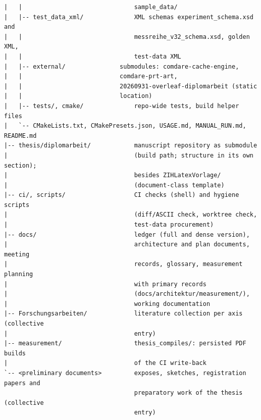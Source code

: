 {\begin{verbatim}
|   |                               sample_data/
|   |-- test_data_xml/              XML schemas experiment_schema.xsd and
|   |                               messreihe_v32_schema.xsd, golden XML,
|   |                               test-data XML
|   |-- external/               submodules: comdare-cache-engine,
|   |                           comdare-prt-art,
|   |                           20260931-overleaf-diplomarbeit (static
|   |                           location)
|   |-- tests/, cmake/              repo-wide tests, build helper files
|   `-- CMakeLists.txt, CMakePresets.json, USAGE.md, MANUAL_RUN.md, README.md
|-- thesis/diplomarbeit/            manuscript repository as submodule
|                                   (build path; structure in its own section);
|                                   besides ZIHLatexVorlage/
|                                   (document-class template)
|-- ci/, scripts/                   CI checks (shell) and hygiene scripts
|                                   (diff/ASCII check, worktree check,
|                                   test-data procurement)
|-- docs/                           ledger (full and dense version),
|                                   architecture and plan documents, meeting
|                                   records, glossary, measurement planning
|                                   with primary records
|                                   (docs/architektur/measurement/),
|                                   working documentation
|-- Forschungsarbeiten/             literature collection per axis (collective
|                                   entry)
|-- measurement/                    thesis_compiles/: persisted PDF builds
|                                   of the CI write-back
`-- <preliminary documents>         exposes, sketches, registration papers and
                                    preparatory work of the thesis (collective
                                    entry)
\end{verbatim}
}

